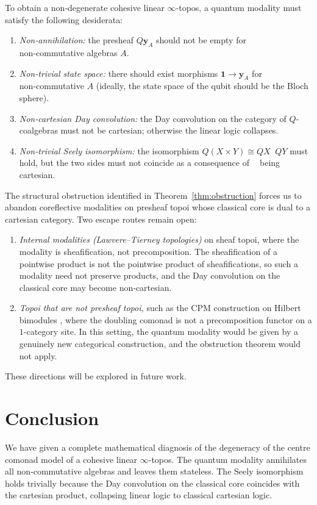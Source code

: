 \documentclass[12pt,a4paper]{article}
\theoremstyle{plain}
\theoremstyle{definition}
\DeclareMathOperator{\Day}{\otimes_{\mathrm{Day}}}
\begin{document}
To obtain a non‑degenerate cohesive linear \(\infty\)-topos, a quantum modality must satisfy the following desiderata:
\begin{enumerate}[nosep]
\item \emph{Non‑annihilation:} the presheaf \(Q\mathbf{y}_A\) should not be empty for non‑commutative algebras \(A\).
\item \emph{Non‑trivial state space:} there should exist morphisms \(\mathbf{1} \to \mathbf{y}_A\) for non‑commutative \(A\) (ideally, the state space of the qubit should be the Bloch sphere).
\item \emph{Non‑cartesian Day convolution:} the Day convolution on the category of \(Q\)-coalgebras must not be cartesian; otherwise the linear logic collapses.
\item \emph{Non‑trivial Seely isomorphism:} the isomorphism \(Q(X\times Y) \cong QX \Day QY\) must hold, but the two sides must not coincide as a consequence of \(\Day\) being cartesian.
\end{enumerate}

The structural obstruction identified in Theorem~\ref{thm:obstruction} forces us to abandon coreflective modalities on presheaf topoi whose classical core is dual to a cartesian category.  Two escape routes remain open:
\begin{enumerate}[nosep]
\item \emph{Internal modalities (Lawvere--Tierney topologies)} on sheaf topoi, where the modality is sheafification, not precomposition.  The sheafification of a pointwise product is not the pointwise product of sheafifications, so such a modality need not preserve products, and the Day convolution on the classical core may become non‑cartesian.
\item \emph{Topoi that are not presheaf topoi,} such as the CPM construction on Hilbert bimodules \cite{Selinger2004}, where the doubling comonad is not a precomposition functor on a \(1\)-category site.  In this setting, the quantum modality would be given by a genuinely new categorical construction, and the obstruction theorem would not apply.
\end{enumerate}
These directions will be explored in future work.

\section{Conclusion}
\label{sec:conclusion}

We have given a complete mathematical diagnosis of the degeneracy of the centre comonad model of a cohesive linear \(\infty\)-topos.  The quantum modality annihilates all non‑commutative algebras and leaves them stateless.  The Seely isomorphism holds trivially because the Day convolution on the classical core coincides with the cartesian product, collapsing linear logic to classical cartesian logic.
\end{document}
